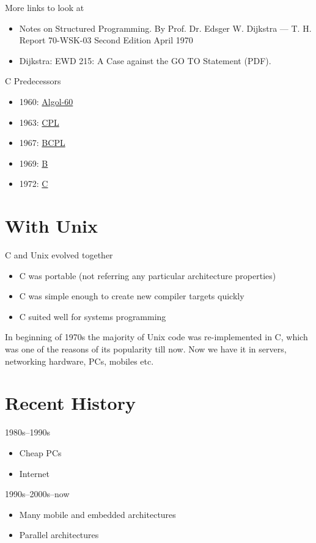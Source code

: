 \documentclass[xetex,aspectratio=149]{beamer}
\begin{document}
\begin{frame}{More links to look at}
	\begin{itemize}
		\item Notes on Structured Programming. By Prof. Dr. Edsger W. Dijkstra — T. H. Report 70-WSK-03 Second Edition April 1970
		\item Dijkstra: EWD 215: A Case against the GO TO Statement (PDF).
	\end{itemize}
\end{frame}

\begin{frame}{C Predecessors}
	\begin{itemize}
		\item 1960: \href{https://en.wikipedia.org/wiki/ALGOL_60\#Code_sample_comparisons}{Algol-60}
		\item 1963: \href{https://en.wikipedia.org/wiki/CPL_(programming_language)\#Example}{CPL}
		\item 1967: \href{https://en.wikipedia.org/wiki/BCPL\#Examples}{BCPL}
		\item 1969: \href{https://en.wikipedia.org/wiki/B_(programming_language)\#Examples}{B}
		\item 1972: \href{https://en.wikipedia.org/wiki/C_(programming_language)\#\%22Hello,_world\%22_example}{C}
	\end{itemize}
\end{frame}

\section{With Unix}

\begin{frame}{C and Unix evolved together}
	\begin{itemize}
		\item C was portable (not referring any particular architecture properties)
		\item C was simple enough to create new compiler targets quickly
		\item C suited well for systems programming
	\end{itemize}

	\pause
	In beginning of 1970s the majority of Unix code was re-implemented in C, which was one of the reasons of its popularity till now. Now we have it in servers, networking hardware, PCs, mobiles etc.
\end{frame}

\section{Recent History}

\begin{frame}{1980s--1990s}
	\begin{itemize}
	\item Cheap PCs
	\item Internet
	\end{itemize}
\end{frame}

\begin{frame}{1990s--2000s--now}
	\begin{itemize}
		\item Many mobile and embedded architectures
		\item Parallel architectures
	\end{itemize}
\end{frame}


\byebye
\end{document}
